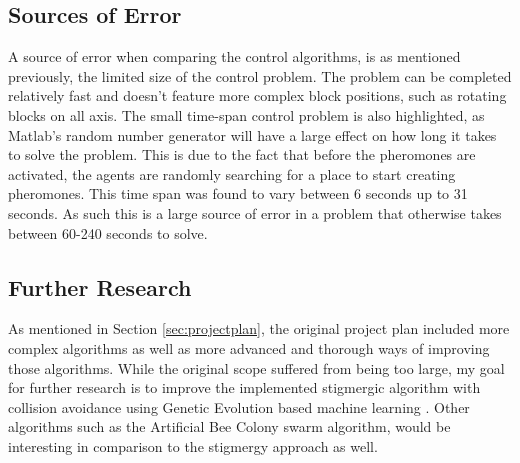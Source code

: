 \subsection{Sources of Error}
A source of error when comparing the control algorithms, is as mentioned previously, the limited size of the control problem. The problem can be completed relatively fast and doesn't feature more complex block positions, such as rotating blocks on all axis. The small time-span control problem is also highlighted, as Matlab's random number generator will have a large effect on how long it takes to solve the problem. This is due to the fact that before the pheromones are activated, the agents are randomly searching for a place to start creating pheromones. This time span was found to vary between 6 seconds up to 31 seconds. As such this is a large source of error in a problem that otherwise takes between 60-240 seconds to solve. 


\subsection{Further Research}
As mentioned in Section \ref{sec:projectplan}, the original project plan included more complex algorithms as well as more advanced and thorough ways of improving those algorithms. While the original scope suffered from being too large, my goal for further research is to improve the implemented stigmergic algorithm with collision avoidance using Genetic Evolution based machine learning \cite{s_machine_2012}. Other algorithms such as the Artificial Bee Colony \cite{bhattacharjee_multi-robot_2011} swarm algorithm, would be interesting in comparison to the stigmergy approach as well. 


